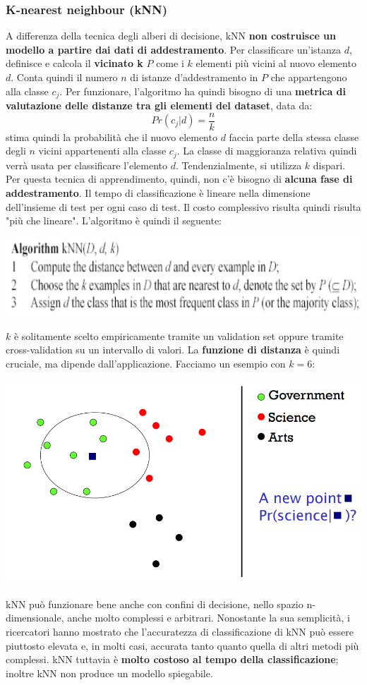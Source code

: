 \documentclass[12pt]{article}
\begin{document}
\subsubsection{K-nearest neighbour (kNN)}
A differenza della tecnica degli alberi di decisione, kNN \textbf{non costruisce un modello a partire dai dati di addestramento}.
Per classificare un'istanza $d$, definisce e calcola il \textbf{vicinato k} $P$ come i $k$ elementi più vicini al nuovo elemento $d$.
Conta quindi il numero $n$ di istanze d'addestramento in $P$ che appartengono alla classe $c_j$.
Per funzionare, l'algoritmo ha quindi bisogno di una \textbf{metrica di valutazione delle distanze tra gli elementi del dataset}, data da:
$$Pr(c_j|d) = \frac{n}{k}$$
stima quindi la probabilità che il nuovo elemento $d$ faccia parte della stessa classe degli $n$ vicini appartenenti alla classe $c_j$.
La classe di maggioranza relativa quindi verrà usata per classificare l'elemento $d$.
Tendenzialmente, si utilizza $k$ dispari.
Per questa tecnica di apprendimento, quindi, non c'è bisogno di \textbf{alcuna fase di addestramento}. Il tempo di classificazione è lineare
nella dimensione dell'insieme di test per ogni caso di test.
Il costo complessivo risulta quindi risulta "più che lineare".
L'algoritmo è quindi il seguente:
\begin{center}
    \includegraphics[width =0.80\linewidth]{Images/82.PNG}
\end{center}
$k$ è solitamente scelto empiricamente tramite un validation set oppure tramite cross-validation su un intervallo di valori.
La \textbf{funzione di distanza} è quindi cruciale, ma dipende dall'applicazione.
Facciamo un esempio con $k = 6$:
\begin{center}
    \includegraphics[width =0.80\linewidth]{Images/83.PNG}
\end{center}
kNN può funzionare bene anche con confini di decisione, nello spazio n-dimensionale, anche molto complessi e arbitrari.
Nonostante la sua semplicità, i ricercatori hanno mostrato che l'accuratezza di classificazione di kNN può essere piuttosto elevata e, in molti casi, accurata tanto quanto quella di altri metodi
più complessi. kNN tuttavia è \textbf{molto costoso al tempo della classificazione}; inoltre kNN non produce un modello spiegabile.
\end{document}
